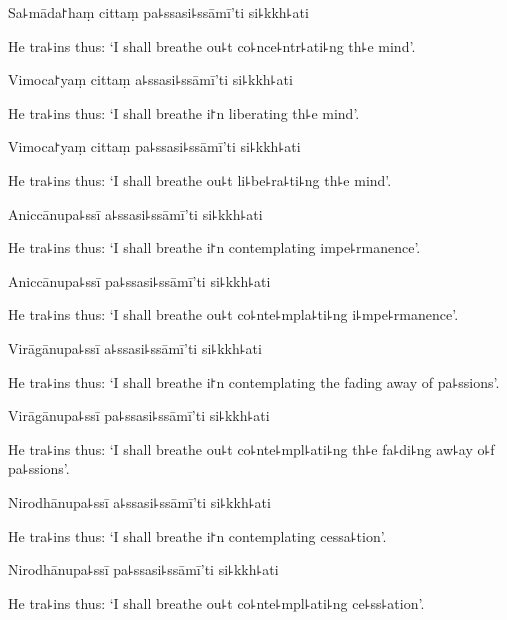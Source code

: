 Sa꜕māda꜓haṃ cittaṃ pa꜕ssasi꜕ssāmī'ti si꜕kkh꜕ati

\begin{english}
  He tra꜕ins thus: `I shall breathe ou꜕t co꜕nce꜕ntr꜕ati꜕ng th꜕e mind'.
\end{english}

Vimoca꜓yaṃ cittaṃ a꜕ssasi꜕ssāmī'ti si꜕kkh꜕ati

\begin{english}
  He tra꜕ins thus: `I shall breathe i꜓n liberating th꜕e mind'.
\end{english}

Vimoca꜓yaṃ cittaṃ pa꜕ssasi꜕ssāmī'ti si꜕kkh꜕ati

\begin{english}
  He tra꜕ins thus: `I shall breathe ou꜕t li꜕be꜕ra꜕ti꜕ng th꜕e mind'.
\end{english}

Aniccānupa꜕ssī a꜕ssasi꜕ssāmī'ti si꜕kkh꜕ati

\begin{english}
  He tra꜕ins thus: `I shall breathe i꜓n contemplating impe꜕rmanence'.
\end{english}

Aniccānupa꜕ssī pa꜕ssasi꜕ssāmī'ti si꜕kkh꜕ati

\begin{english}
  He tra꜕ins thus: `I shall breathe ou꜕t co꜕nte꜕mpla꜕ti꜕ng i꜕mpe꜕rmanence'.
\end{english}

Virāgānupa꜕ssī a꜕ssasi꜕ssāmī'ti si꜕kkh꜕ati

\begin{english}
  He tra꜕ins thus: `I shall breathe i꜓n contemplating the fading away of pa꜕ssions'.
\end{english}

Virāgānupa꜕ssī pa꜕ssasi꜕ssāmī'ti si꜕kkh꜕ati

\begin{english}
  He tra꜕ins thus: `I shall breathe ou꜕t co꜕nte꜕mpl꜕ati꜕ng th꜕e fa꜕di꜕ng aw꜕ay o꜕f pa꜕ssions'.
\end{english}

Nirodhānupa꜕ssī a꜕ssasi꜕ssāmī'ti si꜕kkh꜕ati

\begin{english}
  He tra꜕ins thus: `I shall breathe i꜓n contemplating cessa꜕tion'.
\end{english}

Nirodhānupa꜕ssī pa꜕ssasi꜕ssāmī'ti si꜕kkh꜕ati

\begin{english}
  He tra꜕ins thus: `I shall breathe ou꜕t co꜕nte꜕mpl꜕ati꜕ng ce꜕ss꜕ation'.
\end{english}

